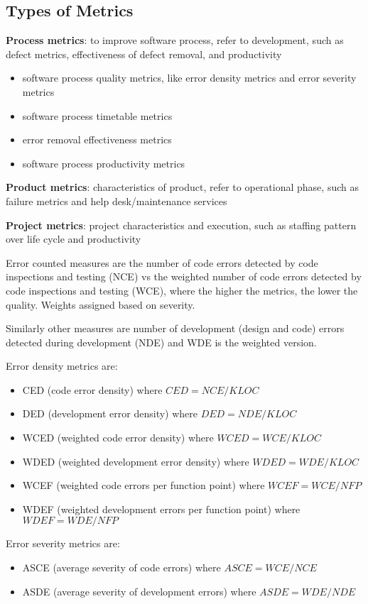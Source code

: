 \documentclass[11pt]{article}
\begin{document}
\subsection{Types of Metrics}
\label{sec:org325f38b}
\textbf{Process metrics}: to improve software process, refer to development, such as defect metrics,
effectiveness of defect removal, and productivity
\begin{itemize}
\item software process quality metrics, like error density metrics and error severity metrics
\item software process timetable metrics
\item error removal effectiveness metrics
\item software process productivity metrics
\end{itemize}

\textbf{Product metrics}: characteristics of product, refer to operational phase, such as failure metrics
and help desk/maintenance services

\textbf{Project metrics}: project characteristics and execution, such as staffing pattern over life cycle and
productivity

Error counted measures are the number of code errors detected by code inspections and testing (NCE)
vs the weighted number of code errors detected by code inspections and testing (WCE),
where the higher the metrics, the lower the quality.
Weights assigned based on severity.

Similarly other measures are number of development (design and code) errors detected during
development (NDE) and WDE is the weighted version.

Error density metrics are:
\begin{itemize}
\item CED (code error density) where \(CED = NCE/KLOC\)
\item DED (development error density) where \(DED = NDE/KLOC\)
\item WCED (weighted code error density) where \(WCED = WCE/KLOC\)
\item WDED (weighted development error density) where \(WDED = WDE/KLOC\)
\item WCEF (weighted code errors per function point) where \(WCEF = WCE/NFP\)
\item WDEF (weighted development errors per function point) where \(WDEF = WDE/NFP\)
\end{itemize}

Error severity metrics are:
\begin{itemize}
\item ASCE (average severity of code errors) where \(ASCE = WCE/NCE\)
\item ASDE (average severity of development errors) where \(ASDE = WDE/NDE\)
\end{itemize}
\end{document}
